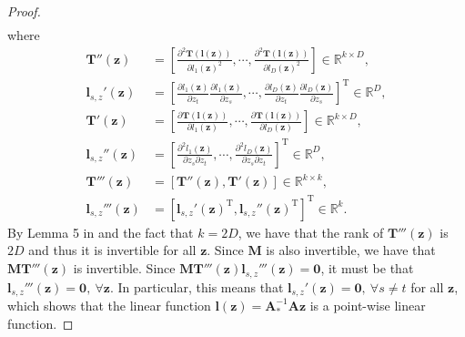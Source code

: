 \documentclass[nohyperref]{article}
\theoremstyle{plain}
\theoremstyle{definition}
\theoremstyle{remark}
\begin{document}
\begin{proof}
\begin{align}
    \end{align}
    where
    \begin{align}
        \mathbf{T}''(\mathbf{z})&=\left[\frac{\partial^2 \mathbf{T}(\mathbf{l}(\mathbf{z}))}{\partial l_1(\mathbf{z})^2},\cdots,\frac{\partial^2 \mathbf{T}(\mathbf{l}(\mathbf{z}))}{\partial l_D(\mathbf{z})^2}\right]\in\mathbb{R}^{k\times D},\\
        \mathbf{l}_{s,z}'(\mathbf{z})&=\left[\frac{\partial l_1(\mathbf{z})}{\partial z_t} \frac{\partial l_1(\mathbf{z})}{\partial z_s},\cdots,\frac{\partial l_D(\mathbf{z})}{\partial z_t} \frac{\partial l_D(\mathbf{z})}{\partial z_s}\right]^{\text{T}}\in\mathbb{R}^{D},\\
        \mathbf{T}'(\mathbf{z})&=\left[\frac{\partial \mathbf{T}(\mathbf{l}(\mathbf{z}))}{\partial l_1(\mathbf{z})},\cdots,\frac{\partial \mathbf{T}(\mathbf{l}(\mathbf{z}))}{\partial l_D(\mathbf{z})}\right]\in\mathbb{R}^{k\times D},\\
        \mathbf{l}_{s,z}''(\mathbf{z})&=\left[\frac{\partial^2 l_1(\mathbf{z})}{\partial z_s \partial z_t},\cdots,\frac{\partial^2 l_D(\mathbf{z})}{\partial z_s \partial z_t}\right]^{\text{T}}\in\mathbb{R}^{D},\\
        \mathbf{T}'''(\mathbf{z})&=[\mathbf{T}''(\mathbf{z}),\mathbf{T}'(\mathbf{z})]\in\mathbb{R}^{k\times k},\\
        \mathbf{l}_{s,z}'''(\mathbf{z})&=[\mathbf{l}_{s,z}'(\mathbf{z})^{\text{T}},\mathbf{l}_{s,z}''(\mathbf{z})^{\text{T}}]^{\text{T}}\in\mathbb{R}^{k}.
    \end{align}
    By Lemma 5 in \citet{Khemakhem_Kingma_Monti_Hyvarinen_2020} and the fact that $k=2D$, we have that the rank of $\mathbf{T}'''(\mathbf{z})$ is $2D$ and thus it is invertible for all $\mathbf{z}$. Since $\mathbf{M}$ is also invertible, we have that $\mathbf{M}\mathbf{T}'''(\mathbf{z})$ is invertible. Since $\mathbf{M}\mathbf{T}'''(\mathbf{z})\mathbf{l}_{s,z}'''(\mathbf{z})=\mathbf{0}$, it must be that $\mathbf{l}_{s,z}'''(\mathbf{z})=\mathbf{0},~\forall\mathbf{z}$. In particular, this means that $\mathbf{l}_{s,z}'(\mathbf{z})=\mathbf{0},~\forall s\not=t$ for all $\mathbf{z}$, which shows that the linear function $\mathbf{l}(\mathbf{z})=\mathbf{A}_{*}^{-1}\mathbf{A}\mathbf{z}$ is a point-wise linear function.
    

\end{proof}
\end{document}
